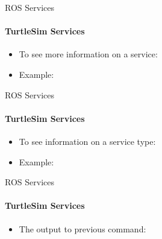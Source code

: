\documentclass{beamer}
\begin{document}
\begin{frame}{ROS Services}
    \framesubtitle{TurtleSim Services}
    \begin{itemize}
        \item To see more information on a service:
       \begin{terminal}
           \color{green} 
        \end{terminal} 
        \item Example:   
               \begin{terminal}
                   \color{green} 
               \end{terminal}      
    \end{itemize}
    \end{frame}

\begin{frame}{ROS Services}
    \framesubtitle{TurtleSim Services}
    \begin{itemize}
        \item To see information on a service type:
        \begin{terminal}
            \color{green} 
        \end{terminal}  
        \item Example:  
        \begin{terminal}
            \color{green} 
        \end{terminal}  
     \end{itemize}
\end{frame}

\begin{frame}{ROS Services}
    \framesubtitle{TurtleSim Services}
    \begin{itemize}
        \item The output to previous command:
        \begin{terminal}
            \color{green} 
        \end{terminal}  
    \end{itemize}
\end{frame}
\end{document}

